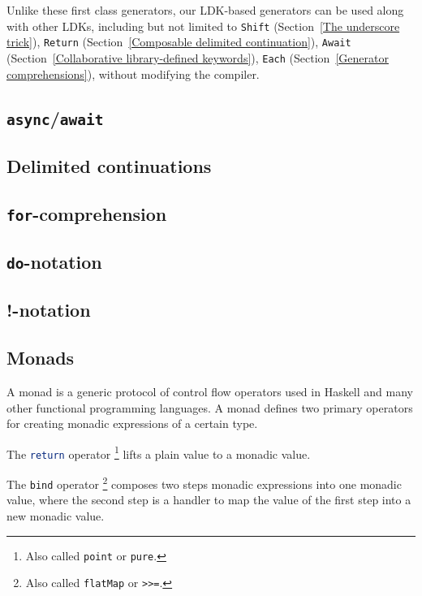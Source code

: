 Unlike these first class generators, our LDK-based generators can be used along with other LDKs, including but not limited to \lstinline{Shift} (Section~\ref{The underscore trick}), \lstinline{Return} (Section~\ref{Composable delimited continuation}), \lstinline{Await} (Section~\ref{Collaborative library-defined keywords}), \lstinline{Each} (Section~\ref{Generator comprehensions}), without modifying the compiler.

\subsection{\lstinline{async}/\lstinline{await}}

\subsection{Delimited continuations}

\subsection{\lstinline{for}-comprehension}\label{for-comprehension}

\subsection{\lstinline{do}-notation}\label{do-notation}


\subsection{!-notation}

\subsection{Monads}\label{Monads}

A monad is a generic protocol of control flow operators used in Haskell and many other functional programming languages. A monad defines two primary operators for creating monadic expressions of a certain type.
\begin{enumerate*}
  \item The \lstinline[language=Haskell,deletekeywords={return}]{return} operator \footnote{Also called \lstinline{point} or \lstinline{pure}.} lifts a plain value to a monadic value.
  \item The \lstinline{bind} operator \footnote{Also called \lstinline{flatMap} or \lstinline{>>=}.} composes two steps monadic expressions into one monadic value, where the second step is a handler to map the value of the first step into a new monadic value.
\end{enumerate*}

